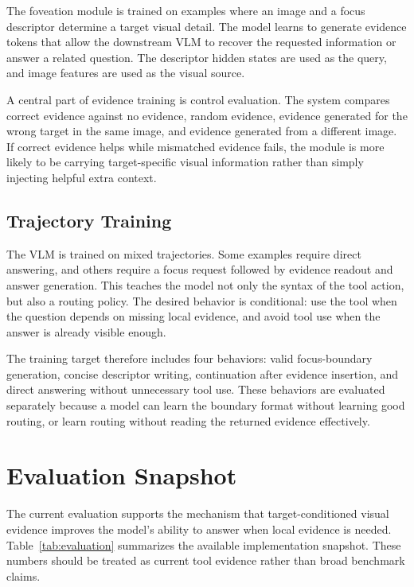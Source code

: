 \documentclass[10pt,twocolumn]{article}
\begin{document}
The foveation module is trained on examples where an image and a focus descriptor determine a target visual detail. The model learns to generate evidence tokens that allow the downstream VLM to recover the requested information or answer a related question. The descriptor hidden states are used as the query, and image features are used as the visual source.

A central part of evidence training is control evaluation. The system compares correct evidence against no evidence, random evidence, evidence generated for the wrong target in the same image, and evidence generated from a different image. If correct evidence helps while mismatched evidence fails, the module is more likely to be carrying target-specific visual information rather than simply injecting helpful extra context.

\subsection{Trajectory Training}

The VLM is trained on mixed trajectories. Some examples require direct answering, and others require a focus request followed by evidence readout and answer generation. This teaches the model not only the syntax of the tool action, but also a routing policy. The desired behavior is conditional: use the tool when the question depends on missing local evidence, and avoid tool use when the answer is already visible enough.

The training target therefore includes four behaviors: valid focus-boundary generation, concise descriptor writing, continuation after evidence insertion, and direct answering without unnecessary tool use. These behaviors are evaluated separately because a model can learn the boundary format without learning good routing, or learn routing without reading the returned evidence effectively.

\section{Evaluation Snapshot}

The current evaluation supports the mechanism that target-conditioned visual evidence improves the model's ability to answer when local evidence is needed. Table~\ref{tab:evaluation} summarizes the available implementation snapshot. These numbers should be treated as current tool evidence rather than broad benchmark claims.
\end{document}
